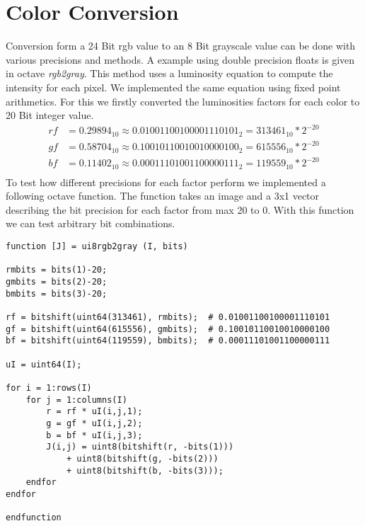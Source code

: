 \documentclass[a4paper]{scrartcl}
\begin{document}
	\section{Color Conversion}
	Conversion form a 24 Bit rgb value to an 8 Bit grayscale value can be done with various precisions and methods. A example using double precision floats is given in octave \textit{rgb2gray}. This method uses a luminosity equation to compute the intensity for each pixel. We implemented the same equation using fixed point arithmetics. For this we firstly converted the luminosities factors for each color to 20 Bit integer value.
	\begin{align*}
		rf &= 0.29894_{10} \approx  0.01001100100001110101_{2} = 313461_{10} * 2^{-20} \\
		gf &= 0.58704_{10} \approx  0.10010110010010000100_{2} = 615556_{10} * 2^{-20} \\
		bf &= 0.11402_{10} \approx  0.00011101001100000111_{2} = 119559_{10} * 2^{-20} \\
	\end{align*}
	To test how different precisions for each factor perform we implemented a following octave function. The function takes an image and a 3x1 vector describing the bit precision for each factor from max 20 to 0. With this function we can test arbitrary bit combinations. 
\begin{lstlisting}
function [J] = ui8rgb2gray (I, bits)

rmbits = bits(1)-20;
gmbits = bits(2)-20;
bmbits = bits(3)-20;

rf = bitshift(uint64(313461), rmbits);  # 0.01001100100001110101
gf = bitshift(uint64(615556), gmbits);  # 0.10010110010010000100
bf = bitshift(uint64(119559), bmbits);  # 0.00011101001100000111

uI = uint64(I);

for i = 1:rows(I)
	for j = 1:columns(I)
		r = rf * uI(i,j,1);
		g = gf * uI(i,j,2);
		b = bf * uI(i,j,3);
		J(i,j) = uint8(bitshift(r, -bits(1))) 
			+ uint8(bitshift(g, -bits(2))) 
			+ uint8(bitshift(b, -bits(3)));
	endfor
endfor

endfunction
\end{lstlisting}
	
\end{document}
